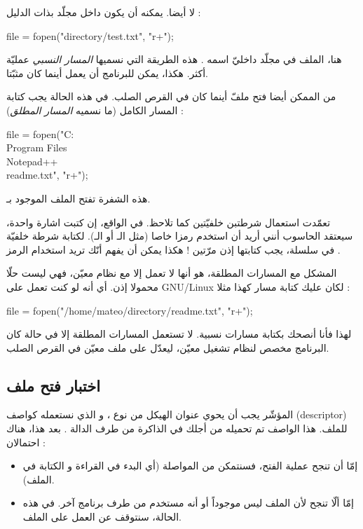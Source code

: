 لا أيضا. يمكنه أن يكون داخل مجلّد بذات الدليل :

\begin{Csource}
  file = fopen("directory/test.txt", "r+");
\end{Csource}

هنا، الملف
في مجلّد  داخليّ اسمه
.
هذه الطريقة التي نسميها
\textit{المسار النسبي}
عمليّة أكثر. هكذا، يمكن للبرنامج أن يعمل أينما كان مثبّتا.

من الممكن أيضا فتح ملفّ أينما كان في القرص الصلب. في هذه الحالة يجب كتابة المسار الكامل (ما نسميه
\textit{المسار المطلق}) :

\begin{Csource}
  file = fopen("C:\\Program Files\\Notepad++\\readme.txt", "r+");
\end{Csource}

هذه الشفرة تفتح الملف
الموجود بـ.

\begin{warning}
  تعمّدت استعمال شرطتبن خلفيّتين
\InlineCode{\textbackslash}
  كما تلاحظ. في الواقع، إن كتبت اشارة واحدة، سيعتقد الحاسوب أنني أريد أن استخدم رمزا خاصا (مثل الـ
أو الـ).
لكتابة شرطة خلفيّة في سلسلة، يجب كتابتها إذن مرّتين ! هكذا يمكن أن يفهم أنّك تريد استخدام الرمز
\InlineCode{\textbackslash}.
\end{warning}

المشكل مع المسارات المطلقة، هو أنها لا تعمل إلا مع نظام معيّن، فهي ليست حلّا محمولا إذن. أي أنه لو كنت تعمل على
\textenglish{GNU/Linux}
لكان عليك كتابة مسار كهذا مثلا :

\begin{Csource}
  file = fopen("/home/mateo/directory/readme.txt", "r+");
\end{Csource}

لهذا فأنا أنصحك بكتابة مسارات نسبية. لا تستعمل المسارات المطلقة إلا في حالة كان البرنامج مخصص لنظام تشغيل معيّن، ليعدّل على ملف معيّن في القرص الصلب.

\subsection{اختبار فتح ملف}
المؤشّر
يجب أن يحوي عنوان الهيكل من نوع
،
و الذي نستعمله كواصف
(\textenglish{descriptor})
للملف. هذا الواصف تم تحميله من أجلك في الذاكرة من طرف الدالة
.
بعد هذا، هناك احتمالان :
\begin{itemize}
  \item إمّا أن تنجح عملية الفتح، فسنتمكن من المواصلة (أي البدء في القراءة و الكتابة في الملف).
  \item إمّا ألّا تنجح لأن الملف ليس موجوداً أو أنه مستخدم من طرف برنامج آخر. في هذه الحالة، سنتوقف عن العمل على الملف.
\end{itemize}

